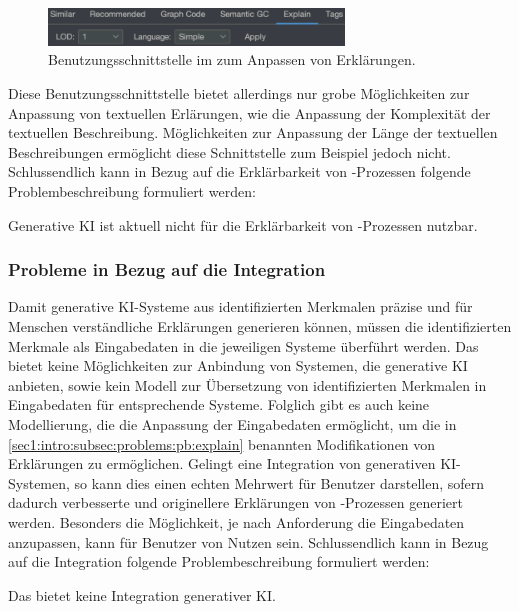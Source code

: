 \begin{figure}[htb]
    \centering
    \includegraphics[width=0.7\textwidth]{resources/images/explain-ui.png}
    \caption{Benutzungsschnittstelle im \gmaf{} zum Anpassen von Erklärungen.}
    \label{sec1:intro:subsec:problems:fig:explain-ui}
\end{figure}
Diese Benutzungsschnittstelle bietet allerdings nur grobe Möglichkeiten zur Anpassung von textuellen Erlärungen, wie die Anpassung der Komplexität der textuellen Beschreibung.
Möglichkeiten zur Anpassung der Länge der textuellen Beschreibungen ermöglicht diese Schnittstelle zum Beispiel jedoch nicht. Schlussendlich kann in Bezug auf die Erklärbarkeit von \mmir{}-Prozessen folgende Problembeschreibung formuliert werden:

\problemstmt{} Generative KI ist aktuell nicht für die Erklärbarkeit von \mmir{}-Prozessen nutzbar.

\subsubsection{Probleme in Bezug auf die Integration}
\label{sec1:intro:subsec:problems:pb:integration}
Damit generative KI-Systeme aus identifizierten Merkmalen präzise und für Menschen verständliche Erklärungen generieren können, müssen die identifizierten Merkmale als Eingabedaten in die jeweiligen Systeme überführt werden.
Das \gmaf{} bietet keine Möglichkeiten zur Anbindung von Systemen, die generative KI anbieten, sowie kein Modell zur Übersetzung von identifizierten Merkmalen in Eingabedaten für entsprechende Systeme.
Folglich gibt es auch keine Modellierung, die die Anpassung der Eingabedaten ermöglicht, um die in \cref{sec1:intro:subsec:problems:pb:explain} benannten Modifikationen von Erklärungen zu ermöglichen.
Gelingt eine Integration von generativen KI-Systemen, so kann dies einen echten Mehrwert für Benutzer darstellen, sofern dadurch verbesserte und originellere Erklärungen von \mmir{}-Prozessen generiert werden.
Besonders die Möglichkeit, je nach Anforderung die Eingabedaten anzupassen, kann für Benutzer von Nutzen sein.
Schlussendlich kann in Bezug auf die Integration folgende Problembeschreibung formuliert werden:

\problemstmt{} Das \gmaf{} bietet keine Integration generativer KI.

